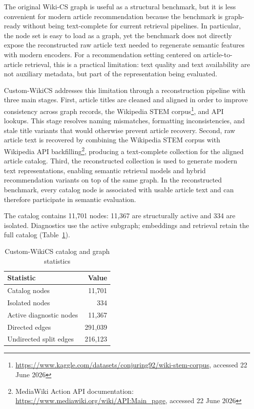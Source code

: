 \documentclass[runningheads]{llncs}
\begin{document}

The original Wiki-CS graph is useful as a structural benchmark, but it is less
convenient for modern article recommendation because the benchmark is graph-ready
without being text-complete for current retrieval pipelines. In particular, the
node set is easy to load as a graph, yet the benchmark does not directly expose
the reconstructed raw article text needed to regenerate semantic features with
modern encoders. For a recommendation setting centered on article-to-article
retrieval, this is a practical limitation: text quality and text availability are
not auxiliary metadata, but part of the representation being evaluated.

Custom-WikiCS addresses this limitation through a reconstruction pipeline with
three main stages. First, article titles are cleaned and aligned in order to
improve consistency across graph records, the Wikipedia STEM corpus\footnote{%
\url{https://www.kaggle.com/datasets/conjuring92/wiki-stem-corpus}, accessed
22 June 2026}, and API
lookups. This stage resolves naming mismatches, formatting inconsistencies, and
stale title variants that would otherwise prevent article recovery. Second, raw
article text is recovered by combining the Wikipedia STEM corpus with Wikipedia
API backfilling\footnote{MediaWiki Action API documentation:
\url{https://www.mediawiki.org/wiki/API:Main_page}, accessed 22 June 2026},
producing a text-complete collection for the aligned article
catalog. Third, the reconstructed collection is used to generate modern text
representations, enabling semantic retrieval models and hybrid recommendation
variants on top of the same graph. In the reconstructed benchmark, every
catalog node is associated with usable article text and can therefore participate
in semantic evaluation.

The catalog contains 11,701 nodes: 11,367 are structurally active and 334 are
isolated. Diagnostics use the active subgraph; embeddings and retrieval retain
the full catalog (Table~\ref{tab:dataset-stats}).

\begin{table}[!htbp]
\caption{Custom-WikiCS catalog and graph statistics}
\label{tab:dataset-stats}
\centering
\begin{tabular}{lr}
\toprule
\textbf{Statistic} & \textbf{Value} \\
\midrule
Catalog nodes & 11,701 \\
Isolated nodes & 334 \\
Active diagnostic nodes & 11,367 \\
Directed edges & 291,039 \\
Undirected split edges & 216,123 \\
\bottomrule
\end{tabular}
\end{table}
\end{document}
